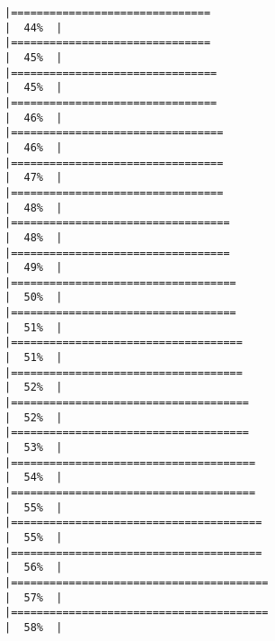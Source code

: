 \documentclass[
]{book}
\begin{document}
\begin{verbatim}
|===============================                                       |  44%  |                                                                              |===============================                                       |  45%  |                                                                              |================================                                      |  45%  |                                                                              |================================                                      |  46%  |                                                                              |=================================                                     |  46%  |                                                                              |=================================                                     |  47%  |                                                                              |=================================                                     |  48%  |                                                                              |==================================                                    |  48%  |                                                                              |==================================                                    |  49%  |                                                                              |===================================                                   |  50%  |                                                                              |===================================                                   |  51%  |                                                                              |====================================                                  |  51%  |                                                                              |====================================                                  |  52%  |                                                                              |=====================================                                 |  52%  |                                                                              |=====================================                                 |  53%  |                                                                              |======================================                                |  54%  |                                                                              |======================================                                |  55%  |                                                                              |=======================================                               |  55%  |                                                                              |=======================================                               |  56%  |                                                                              |========================================                              |  57%  |                                                                              |========================================                              |  58%  |                                                                              
\end{verbatim}
\end{document}
